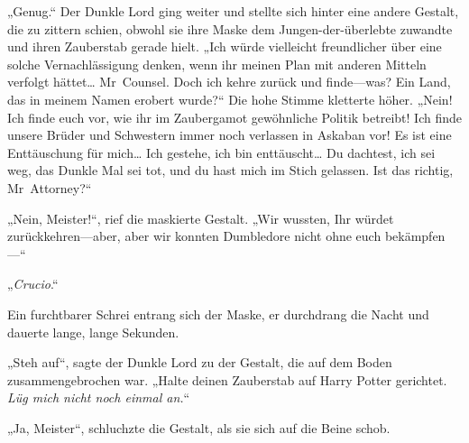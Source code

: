„Genug.“ Der Dunkle Lord ging weiter und stellte sich hinter eine andere Gestalt, die zu zittern schien, obwohl sie ihre Maske dem Jungen-der-überlebte zuwandte und ihren Zauberstab gerade hielt.
„Ich würde vielleicht freundlicher über eine solche Vernachlässigung denken, wenn ihr meinen Plan mit anderen Mitteln verfolgt hättet… Mr~Counsel. Doch ich kehre zurück und finde—was? Ein Land, das in meinem Namen erobert wurde?“
Die hohe Stimme kletterte höher.
„Nein! Ich finde euch vor, wie ihr im Zaubergamot gewöhnliche Politik betreibt! Ich finde unsere Brüder und Schwestern immer noch verlassen in Askaban vor! Es ist eine Enttäuschung für mich… Ich gestehe, ich bin enttäuscht… Du dachtest, ich sei weg, das Dunkle Mal sei tot, und du hast mich im Stich gelassen. Ist das richtig, Mr~Attorney?“

„Nein, Meister!“, rief die maskierte Gestalt. „Wir wussten, Ihr würdet zurückkehren—aber, aber wir konnten Dumbledore nicht ohne euch bekämpfen—“

„\emph{Crucio}.“

Ein furchtbarer Schrei entrang sich der Maske, er durchdrang die Nacht und dauerte lange, lange Sekunden.

„Steh auf“, sagte der Dunkle Lord zu der Gestalt, die auf dem Boden zusammengebrochen war. „Halte deinen Zauberstab auf Harry Potter gerichtet. \emph{Lüg mich nicht noch einmal an.}“

„Ja, Meister“, schluchzte die Gestalt, als sie sich auf die Beine schob.

